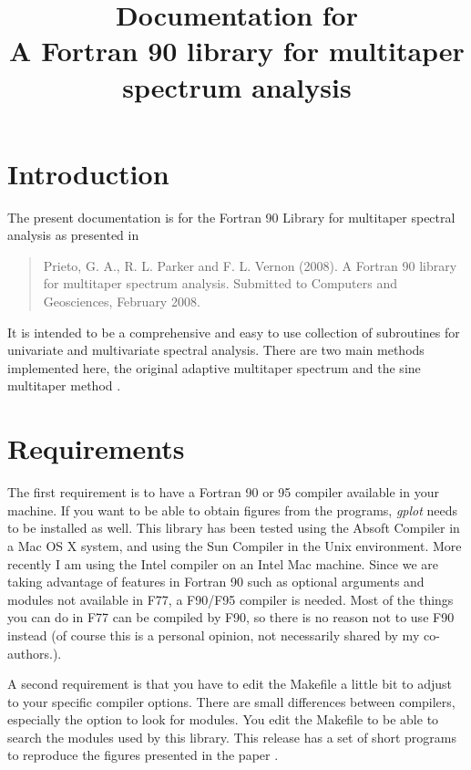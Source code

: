 \documentclass{article}
\title{Documentation for \\
	A Fortran 90 library for multitaper spectrum analysis}
\date{}
\begin{document}

\maketitle

\section{Introduction}

The present documentation is for the Fortran 90 Library for multitaper spectral analysis as presented in 
\begin{quotation}
Prieto, G. A., R. L. Parker and F. L. Vernon (2008). A Fortran 90 library for multitaper spectrum analysis. Submitted to Computers and Geosciences, February 2008.
\end{quotation}
It is intended to be a comprehensive and easy to use collection of subroutines for univariate and multivariate spectral analysis. There are two main methods implemented here, the original adaptive multitaper spectrum \citep{djt_82} and the sine multitaper method \citep{riedel_sidorenko_95}. 

\section{Requirements}
The first requirement is to have a Fortran 90 or 95 compiler available in your machine. If you want to be able to obtain figures from the programs, {\it gplot} needs to be installed as well. This library has been tested using the Absoft Compiler in a Mac OS X system, and using the Sun Compiler in the Unix environment. More recently I am using the Intel compiler on an Intel Mac machine. Since we are taking advantage of features in Fortran 90 such as optional arguments and modules not available in F77, a F90/F95 compiler is needed. Most of the things you can do in F77 can be compiled by F90, so there is no reason not to use F90 instead (of course this is a personal opinion, not necessarily shared by my co-authors.). 

A second requirement is that you have to edit the Makefile a little bit to adjust to your specific compiler options. There are small differences between compilers, especially the option to look for modules. You edit the Makefile to be able to search the modules used by this library. This release has a set of short programs to reproduce the figures presented in the paper \citep{prieto_08a}.
\end{document}
